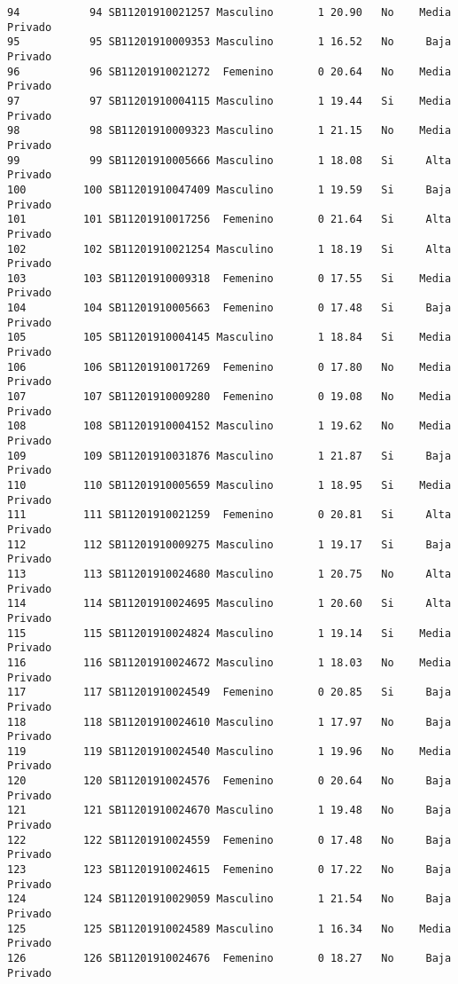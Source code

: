 \documentclass[
  letterpaper,
  DIV=11,
  numbers=noendperiod]{scrartcl}
\begin{document}
\begin{verbatim}
94           94 SB11201910021257 Masculino       1 20.90   No    Media Privado
95           95 SB11201910009353 Masculino       1 16.52   No     Baja Privado
96           96 SB11201910021272  Femenino       0 20.64   No    Media Privado
97           97 SB11201910004115 Masculino       1 19.44   Si    Media Privado
98           98 SB11201910009323 Masculino       1 21.15   No    Media Privado
99           99 SB11201910005666 Masculino       1 18.08   Si     Alta Privado
100         100 SB11201910047409 Masculino       1 19.59   Si     Baja Privado
101         101 SB11201910017256  Femenino       0 21.64   Si     Alta Privado
102         102 SB11201910021254 Masculino       1 18.19   Si     Alta Privado
103         103 SB11201910009318  Femenino       0 17.55   Si    Media Privado
104         104 SB11201910005663  Femenino       0 17.48   Si     Baja Privado
105         105 SB11201910004145 Masculino       1 18.84   Si    Media Privado
106         106 SB11201910017269  Femenino       0 17.80   No    Media Privado
107         107 SB11201910009280  Femenino       0 19.08   No    Media Privado
108         108 SB11201910004152 Masculino       1 19.62   No    Media Privado
109         109 SB11201910031876 Masculino       1 21.87   Si     Baja Privado
110         110 SB11201910005659 Masculino       1 18.95   Si    Media Privado
111         111 SB11201910021259  Femenino       0 20.81   Si     Alta Privado
112         112 SB11201910009275 Masculino       1 19.17   Si     Baja Privado
113         113 SB11201910024680 Masculino       1 20.75   No     Alta Privado
114         114 SB11201910024695 Masculino       1 20.60   Si     Alta Privado
115         115 SB11201910024824 Masculino       1 19.14   Si    Media Privado
116         116 SB11201910024672 Masculino       1 18.03   No    Media Privado
117         117 SB11201910024549  Femenino       0 20.85   Si     Baja Privado
118         118 SB11201910024610 Masculino       1 17.97   No     Baja Privado
119         119 SB11201910024540 Masculino       1 19.96   No    Media Privado
120         120 SB11201910024576  Femenino       0 20.64   No     Baja Privado
121         121 SB11201910024670 Masculino       1 19.48   No     Baja Privado
122         122 SB11201910024559  Femenino       0 17.48   No     Baja Privado
123         123 SB11201910024615  Femenino       0 17.22   No     Baja Privado
124         124 SB11201910029059 Masculino       1 21.54   No     Baja Privado
125         125 SB11201910024589 Masculino       1 16.34   No    Media Privado
126         126 SB11201910024676  Femenino       0 18.27   No     Baja Privado

\end{verbatim}
\end{document}
